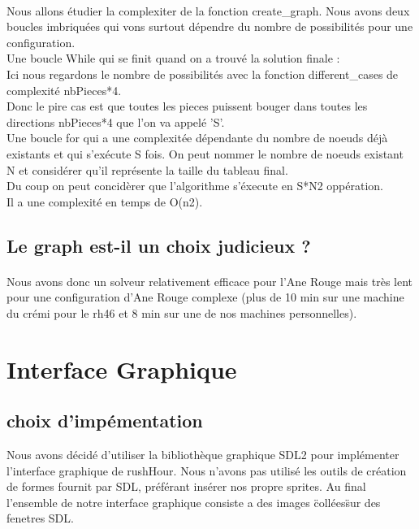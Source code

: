 \documentclass {article}
\begin{document}
\paragraph{}
Nous allons étudier la complexiter de la fonction create\_graph. Nous avons deux boucles imbriquées qui vons surtout dépendre du nombre de possibilités pour une configuration.\\
Une boucle While qui se finit quand on a trouvé la solution finale :\\
Ici nous regardons le nombre de possibilités avec la fonction different\_cases de complexité nbPieces*4.\\
Donc le pire cas est que toutes les pieces puissent bouger dans toutes les directions nbPieces*4 que l'on va appelé 'S'.\\
Une boucle for qui a une complexitée dépendante du nombre de noeuds déjà existants et qui s'exécute S fois. On peut nommer le nombre de noeuds existant N et considérer qu'il représente la taille du tableau final.\\
Du coup on peut concidèrer que l'algorithme s'éxecute en S*N2 oppération.\\
Il a une complexité en temps de O(n2).


\subsection{Le graph est-il un choix judicieux ?}
\paragraph{}
Nous avons donc un solveur relativement efficace pour l'Ane Rouge mais très lent pour une configuration d'Ane Rouge complexe (plus de 10 min sur une machine du crémi pour le rh46 et 8 min sur une de nos machines personnelles).

\section{Interface Graphique}
\subsection{choix d'impémentation}
Nous avons décidé d'utiliser la bibliothèque graphique SDL2 pour implémenter l'interface graphique de rushHour. Nous n'avons pas utilisé les outils de création de formes fournit par SDL, préférant insérer nos propre sprites. Au final l'ensemble de notre interface graphique consiste a des images \"collées\" sur des fenetres SDL.
\paragraph{}
\end{document}
